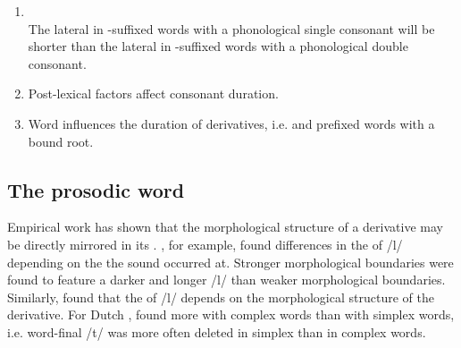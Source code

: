 \begin{enumerate}
		
	\item  {}  \\
	The lateral in -suffixed words with a phonological single consonant will be shorter than the lateral in  -suffixed words with a phonological double consonant. 
	
	\item Post-lexical factors affect consonant duration.
	


	\item Word  influences the duration of  derivatives, i.e.  and prefixed words with a bound root.
	
\end{enumerate}



\subsection{The prosodic word} {\label{prosodic word}}


Empirical work has shown that the morphological structure of a derivative may be directly mirrored in its . %
\cite{Sproat.1993b}, for example, found differences in the  of /l/ depending on the  the sound occurred at. Stronger morphological boundaries were found to feature a darker and longer /l/ than weaker morphological boundaries. Similarly, \cite{LeeKim.2013} found that the  of /l/ depends on the morphological structure of the derivative. 
For Dutch , \cite{Schuppler.2012} found more  with complex words than with simplex words, i.e. word-final /t/ was more often deleted in simplex than in complex words.


